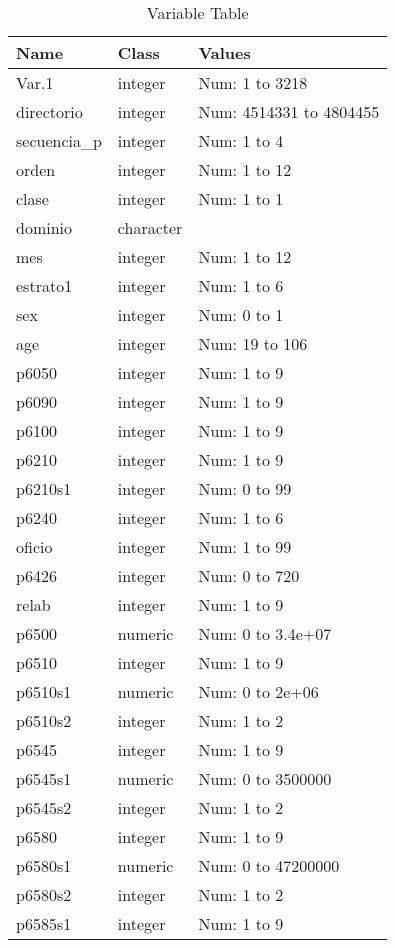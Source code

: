 \begin{table}[!htbp] \centering \renewcommand*{\arraystretch}{1.1}\caption{Variable Table}
\begin{tabular}{p{}p{}p{}}
\hline
\hline
Name & Class & Values \\ 
\hline
Var.1 & integer & Num: 1 to 3218 \\ 
directorio & integer & Num: 4514331 to 4804455 \\ 
secuencia\_p & integer & Num: 1 to 4 \\ 
orden & integer & Num: 1 to 12 \\ 
clase & integer & Num: 1 to 1 \\ 
dominio & character &  \\ 
mes & integer & Num: 1 to 12 \\ 
estrato1 & integer & Num: 1 to 6 \\ 
sex & integer & Num: 0 to 1 \\ 
age & integer & Num: 19 to 106 \\ 
p6050 & integer & Num: 1 to 9 \\ 
p6090 & integer & Num: 1 to 9 \\ 
p6100 & integer & Num: 1 to 9 \\ 
p6210 & integer & Num: 1 to 9 \\ 
p6210s1 & integer & Num: 0 to 99 \\ 
p6240 & integer & Num: 1 to 6 \\ 
oficio & integer & Num: 1 to 99 \\ 
p6426 & integer & Num: 0 to 720 \\ 
relab & integer & Num: 1 to 9 \\ 
p6500 & numeric & Num: 0 to 3.4e+07 \\ 
p6510 & integer & Num: 1 to 9 \\ 
p6510s1 & numeric & Num: 0 to 2e+06 \\ 
p6510s2 & integer & Num: 1 to 2 \\ 
p6545 & integer & Num: 1 to 9 \\ 
p6545s1 & numeric & Num: 0 to 3500000 \\ 
p6545s2 & integer & Num: 1 to 2 \\ 
p6580 & integer & Num: 1 to 9 \\ 
p6580s1 & numeric & Num: 0 to 47200000 \\ 
p6580s2 & integer & Num: 1 to 2 \\ 
p6585s1 & integer & Num: 1 to 9 \\ 

\end{tabular}
\end{table}
